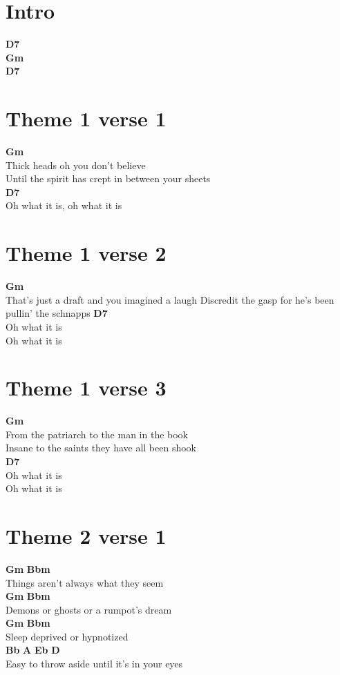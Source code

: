 \documentclass{article}
\begin{document}
\section*{Intro}
\textbf{D7}\\
\textbf{Gm}\\
\textbf{D7}

\section*{Theme 1 verse 1}
\textbf{Gm}\\
Thick heads oh you don’t believe\\
Until the spirit has crept in between your sheets\\
\textbf{D7}\\
Oh what it is, oh what it is

\section*{Theme 1 verse 2}
\textbf{Gm}\\
That’s just a draft and you imagined a laugh
Discredit the gasp for he’s been pullin’ the schnapps
\textbf{D7}\\
Oh what it is\\
Oh what it is

\section*{Theme 1 verse 3}
         \textbf{Gm}\\
From the patriarch to the man in the book\\
Insane to the saints they have all been shook\\
\textbf{D7}\\
Oh what it is\\
Oh what it is

\section*{Theme 2 verse 1}
\textbf{Gm}                   \textbf{Bbm}\\
Things aren’t always what they seem\\
\textbf{Gm}                  \textbf{Bbm}\\
Demons or ghosts or a rumpot’s dream\\
\textbf{Gm}                \textbf{Bbm}\\
Sleep deprived or hypnotized\\
\textbf{Bb}           \textbf{A}               \textbf{Eb}      \textbf{D}\\
Easy to throw aside until it’s in your eyes
\end{document}
